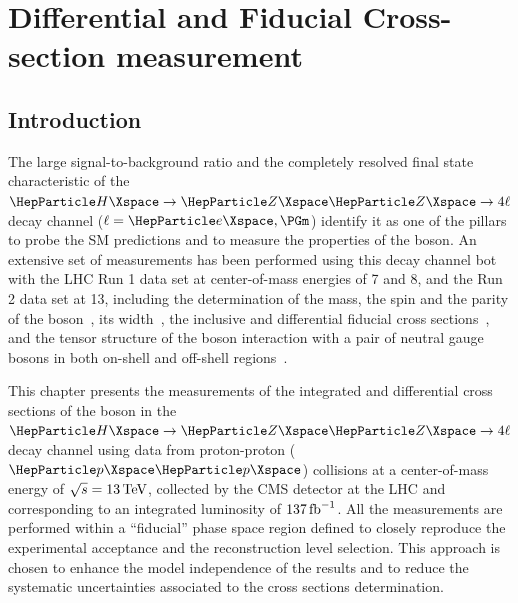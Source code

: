 \chapter{Differential and Fiducial Cross-section measurement}

\section{Introduction} \label{sec:intro}

The large signal-to-background ratio and the completely resolved final state characteristic of the $\HZZfl$ decay channel ($\ell=\Pe,\Pgm$) identify it as one of the pillars to probe the SM predictions and to measure the properties of the \PH boson.
An extensive set of measurements has been performed using this decay channel bot with the LHC Run 1 data set at center-of-mass energies of 7 and 8\TeV, and the Run 2 data set at 13\TeV, including the determination of
the mass, the spin and the parity of the \PH boson~\cite{ATLASH4lLegacyRun1,CMSH4lLegacyRun1,CMSH4lSpinParity,CMSH4lAnomalousCouplings,CMSH4l2016,ATLASH4l2016},
its width~\cite{CMSH4lWidth,CMSH4lLifetime,ATLASH4lWidth,ATLASH4lWidth2016}, the inclusive and differential fiducial cross sections~\cite{ATLASH4lFiducial8TeV,CMSH4lFiducial8TeV, CMSH4l2016,ATLASH4lFiducial2016, ATLASH4lLegacyRun2, ATLASH4lFiducialRun2}, and the tensor structure of the \PH boson interaction with a pair of neutral gauge bosons in both on-shell and off-shell regions~\cite{CMSH4lAnomalousCouplings,CMSH4lLifetime, CMSH4lAnomalousCouplings2016,ATLASH4l2016,CMSHVVAnomalousCouplings2016}.

This chapter presents the measurements of the integrated and differential cross sections of the \PH boson in the $\HZZfl$ decay channel using data from proton-proton ($\Pp\Pp$) collisions at a center-of-mass energy of $\sqrt{s}=13\,\text{Te\hspace{-.08em}V}$, collected by the CMS detector at the LHC and corresponding to an integrated luminosity of $137\mbox{\ensuremath{\,\text{fb}^{-1}}}$. 
All the measurements are performed within a ``fiducial'' phase space region defined to closely reproduce the experimental acceptance and the reconstruction level selection.
This approach is chosen to enhance the model independence of the results and to reduce the systematic uncertainties associated to the cross sections determination.

